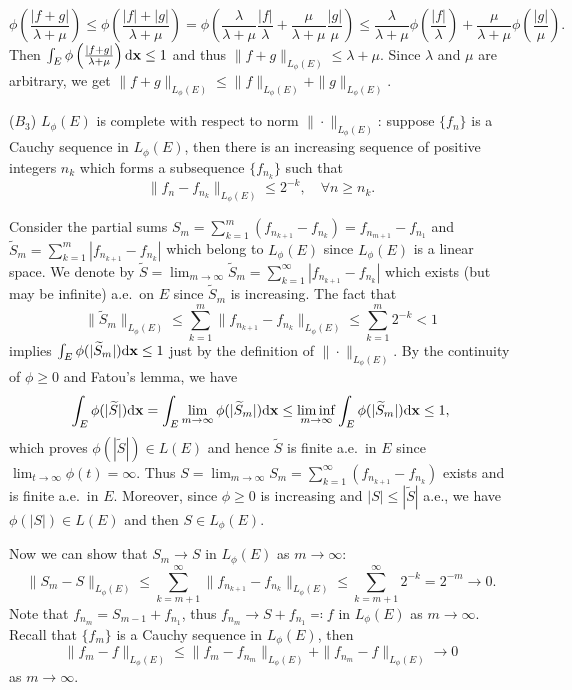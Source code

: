 \begin{exercise}{8.28}
\begin{itemize}
    $$\phi\left(\frac{|f+g|}{\lambda+\mu}\right)\leq \phi\left(\frac{|f|+|g|}{\lambda+\mu}\right)=\phi\left(\frac{\lambda}{\lambda+\mu}\frac{|f|}{\lambda}+\frac{\mu}{\lambda+\mu}\frac{|g|}{\mu}\right)\leq\frac{\lambda}{\lambda+\mu}\phi\left(\frac{|f|}{\lambda}\right)+\frac{\mu}{\lambda+\mu}\phi\left(\frac{|g|}{\mu}\right).$$
    Then $\int_E\phi\left(\frac{|f+g|}{\lambda+\mu}\right)\mathrm{d}\mathbf{x}\leq1$ and thus $\|f+g\|_{L_\phi(E)}\leq\lambda+\mu$. Since $\lambda$ and $\mu$ are arbitrary, we get $\|f+g\|_{L_\phi(E)}\leq\|f\|_{L_\phi(E)}+\|g\|_{L_\phi(E)}$.
\end{itemize}

($B_3$) $L_\phi(E)$ is complete with respect to norm $\|\cdot\|_{L_\phi(E)}$:
suppose $\{f_n\}$ is a Cauchy sequence in ${L_\phi(E)}$, then there is an increasing sequence of positive integers $n_k$ which forms a subsequence $\{f_{n_k}\}$ such that
$$\|f_n-f_{n_k}\|_{L_\phi(E)}\leq 2^{-k},\quad \forall n\geq n_k.$$

Consider the partial sums $S_m=\sum_{k=1}^{m}(f_{n_{k+1}}-f_{n_k})=f_{n_{m+1}}-f_{n_1}$ and $\widetilde{S}_m=\sum_{k=1}^{m}|f_{n_{k+1}}-f_{n_k}|$ which belong to $L_\phi(E)$ since $L_\phi(E)$ is a linear space. We denote by $\widetilde{S}=\lim_{m\to\infty}\widetilde{S}_m=\sum_{k=1}^{\infty}|f_{n_{k+1}}-f_{n_k}|$ which exists (but may be infinite) a.e.\ on $E$ since $\widetilde{S}_m$ is increasing. 
The fact that
$$\|\widetilde{S}_m\|_{L_\phi(E)}\leq\sum_{k=1}^{m}\|f_{n_{k+1}}-f_{n_k}\|_{L_\phi(E)}\leq\sum_{k=1}^m2^{-k}<1$$
implies $\int_E\phi(|\widetilde{S}_m|)\mathrm{d}\mathbf{x}\leq 1$ just by the definition of $\|\cdot\|_{L_\phi(E)}$. By the continuity of $\phi\geq0$ and Fatou's lemma, we have
$$\int_E\phi(|\widetilde{S}|)\mathrm{d}\mathbf{x}=\int_E\lim_{m\to\infty}\phi(|\widetilde{S}_m|)\mathrm{d}\mathbf{x}\leq\liminf_{m\to\infty}\int_E\phi(|\widetilde{S}_m|)\mathrm{d}\mathbf{x}\leq1,$$
which proves $\phi(|\widetilde{S}|)\in L(E)$ and hence $\widetilde{S}$ is finite a.e.\ in $E$ since $\lim_{t\to\infty}\phi(t)=\infty$. Thus $S=\lim_{m\to\infty}S_m=\sum_{k=1}^\infty(f_{n_{k+1}}-f_{n_k})$ exists and is finite a.e.\ in $E$. Moreover, since $\phi\geq0$ is increasing and $|S|\leq|\widetilde{S}|$ a.e., we have $\phi(|S|)\in L(E)$ and then $S\in L_\phi(E)$.

Now we can show that $S_m\to S$ in ${L_\phi(E)}$ as $m\to\infty$:
$$\|S_m-S\|_{L_\phi(E)}\leq\sum_{k=m+1}^{\infty}\|f_{n_{k+1}}-f_{n_k}\|_{L_\phi(E)}\leq \sum_{k=m+1}^{\infty}2^{-k}=2^{-m}\to 0.$$
Note that $f_{n_m}=S_{m-1}+f_{n_1}$, thus $f_{n_m}\to S+f_{n_1}\eqqcolon f$ in ${L_\phi(E)}$ as $m\to\infty$. Recall that $\{f_m\}$ is a Cauchy sequence in ${L_\phi(E)}$, then 
$$\|f_m-f\|_{L_\phi(E)}\leq\|f_m-f_{n_m}\|_{L_\phi(E)}+\|f_{n_m}-f\|_{L_\phi(E)}\to0$$
as $m\to\infty$. 
\end{exercise}
